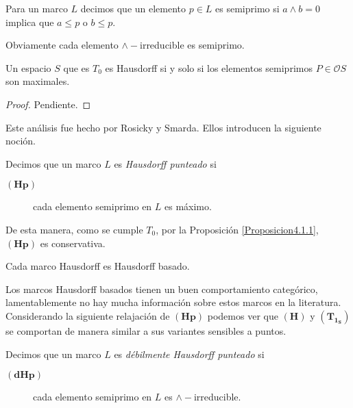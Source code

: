 \begin{dfn}\label{Semiprimo}
    Para un marco $L$ decimos que un elemento $p\in L$ es semiprimo si $a\wedge b=0$ implica que $a\leq p$ o $b\leq p$.
\end{dfn}

Obviamente cada elemento $\wedge-$irreducible es semiprimo. 

\begin{prop}\label{Proposicion4.1.1}
    Un espacio $S$ que es $T_0$ es Hausdorff si y solo si los elementos semiprimos $P\in \mathcal{O}S$ son maximales.
\end{prop}

\begin{proof}
    Pendiente.
\end{proof}

Este análisis fue hecho por Rosicky y Smarda. Ellos introducen la siguiente noción.

\begin{dfn}
    Decimos que un marco $L$ es \emph{Hausdorff punteado} si     
    \begin{description}
        \item[$\mathbf{(Hp)}$] cada elemento semiprimo en $L$ es máximo. 
    \end{description}
\end{dfn}

De esta manera, como se cumple $T_0$, por la Proposición \ref{Proposicion4.1.1}, $\mathbf{(Hp)}$ es conservativa.

\begin{prop}\label{Proposición4.2}
    Cada marco Hausdorff es Hausdorff basado.
\end{prop}

Los marcos Hausdorff basados tienen un buen comportamiento categórico, lamentablemente no hay mucha información sobre estos marcos en la literatura.\\

Considerando la siguiente relajación de $\mathbf{(Hp)}$ podemos ver que $\mathbf{(H)}$ y $\mathbf{(T_{1_S})}$ se comportan de manera similar a sus variantes sensibles a puntos.

\begin{dfn}\label{DHausdorffbasado}
    Decimos que un marco $L$ es \emph{débilmente Hausdorff punteado} si
    \begin{description}
        \item[$\mathbf{(dHp)}$] cada elemento semiprimo en $L$ es $\wedge-$irreducible. 
    \end{description}
\end{dfn}

